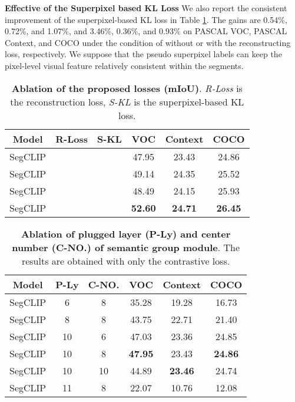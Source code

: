 \documentclass{article}
\theoremstyle{plain}
\theoremstyle{definition}
\theoremstyle{remark}
\newcommand{\cmark}{\ding{51}}\newcommand{\xmark}{\ding{55}}\usepackage{arydshln}
\begin{document}
 \vspace{0.1cm}
 \noindent
 \textbf{Effective of the Superpixel based KL Loss} \quad
We also report the consistent improvement of the superpixel-based KL loss in Table \ref{tab:result_of_ablation}. The gains are 0.54\%, 0.72\%, and 1.07\%, and 3.46\%, 0.36\%, and 0.93\% on PASCAL VOC, PASCAL Context, and COCO under the condition of without or with the reconstructing loss, respectively. We suppose that the pseudo superpixel labels can keep the pixel-level visual feature relatively consistent within the segments. 
\begin{table}[tp]
    \setlength{\tabcolsep}{5pt}
    \centering
    \begin{tabular}{cccccc}
        \toprule
        Model       & R-Loss & S-KL & VOC & Context & COCO \\ \midrule
        SegCLIP     &   &   & 47.95 & 23.43 & 24.86 \\
        SegCLIP     & \cmark &   & 49.14 & 24.35 & 25.52 \\
        SegCLIP     &   & \cmark  & 48.49 & 24.15 & 25.93 \\
        SegCLIP     & \cmark & \cmark & \textbf{52.60} & \textbf{24.71} & \textbf{26.45} \\
        \bottomrule
    \end{tabular}
    \caption{\textbf{Ablation of the proposed losses (mIoU)}. \emph{R-Loss} is the reconstruction loss, \emph{S-KL} is the superpixel-based KL loss.}
    \label{tab:result_of_ablation}
\end{table}
\begin{table}[tp]
    \setlength{\tabcolsep}{5pt}
    \centering
    \begin{tabular}{cccccc}
        \toprule
        Model     & P-Ly & C-NO. & VOC & Context & COCO \\ \midrule
        SegCLIP     & 6  & 8 & 35.28 & 19.28 & 16.73 \\
        SegCLIP     & 8  & 8 & 43.75 & 22.71 & 21.40 \\
        SegCLIP     & 10  & 6 & 47.03 & 23.36 & 24.85 \\
        SegCLIP     & 10  & 8 & \textbf{47.95} & 23.43 & \textbf{24.86} \\
        SegCLIP     & 10  & 10 & 44.89 & \textbf{23.46} & 24.74 \\
        SegCLIP     & 11  & 8 & 22.07 & 10.76 & 12.08 \\
        \bottomrule
    \end{tabular}
    \caption{\textbf{Ablation of plugged layer (P-Ly) and center number (C-NO.) of semantic group module}. The results are obtained with only the contrastive loss.}
    \label{tab:result_of_plug_group}
\end{table}
\end{document}
